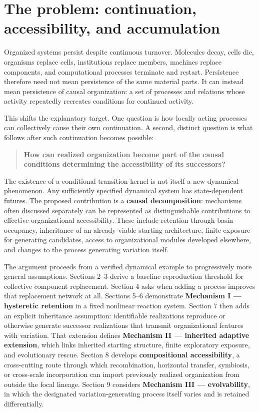 \documentclass[11pt,a4paper]{article}
\begin{document}
\section{The problem: continuation, accessibility, and accumulation}

Organized systems persist despite continuous turnover. Molecules decay, cells die, organisms replace cells, institutions replace members, machines replace components, and computational processes terminate and restart. Persistence therefore need not mean persistence of the same material parts. It can instead mean persistence of causal organization: a set of processes and relations whose activity repeatedly recreates conditions for continued activity.

This shifts the explanatory target. One question is how locally acting processes can collectively cause their own continuation. A second, distinct question is what follows after such continuation becomes possible:

\begin{quote}
\textbf{How can realized organization become part of the causal conditions determining the accessibility of its successors?}
\end{quote}

The existence of a conditional transition kernel is not itself a new dynamical phenomenon. Any sufficiently specified dynamical system has state-dependent futures. The proposed contribution is a \textbf{causal decomposition}: mechanisms often discussed separately can be represented as distinguishable contributions to effective organizational accessibility. These include retention through basin occupancy, inheritance of an already viable starting architecture, finite exposure for generating candidates, access to organizational modules developed elsewhere, and changes to the process generating variation itself.

The argument proceeds from a verified dynamical example to progressively more general assumptions. Sections 2--3 derive a baseline reproduction threshold for collective component replacement. Section 4 asks when adding a process improves that replacement network at all. Sections 5--6 demonstrate \textbf{Mechanism I --- hysteretic retention} in a fixed nonlinear reaction system. Section 7 then adds an explicit inheritance assumption: identifiable realizations reproduce or otherwise generate successor realizations that transmit organizational features with variation. That extension defines \textbf{Mechanism II --- inherited adaptive extension}, which links inherited starting structure, finite exploratory exposure, and evolutionary rescue. Section 8 develops \textbf{compositional accessibility}, a cross-cutting route through which recombination, horizontal transfer, symbiosis, or cross-scale incorporation can import previously realized organization from outside the focal lineage. Section 9 considers \textbf{Mechanism III --- evolvability}, in which the designated variation-generating process itself varies and is retained differentially.
\end{document}
